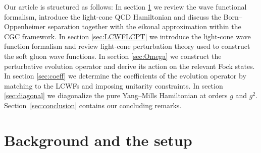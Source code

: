 \documentclass[a4paper,11pt]{article}
\begin{document}
Our article is structured as follows: In section \ref{sec:bgandsetup} we review the wave functional formalism, introduce the light-cone QCD Hamiltonian and discuss the Born–Oppenheimer separation together with the eikonal approximation within the CGC framework. In section \ref{sec:LCWFLCPT} we introduce the light-cone wave function formalism and review light-cone perturbation theory used to construct the soft gluon wave functions. In section \ref{sec:Omega} we construct the perturbative evolution operator and derive its action on the relevant Fock states. In section \ref{sec:coeff} we determine the coefficients of the evolution operator by matching to the LCWFs and imposing unitarity constraints. In section \ref{sec:diagonal} we diagonalize the {\color{chg}pure Yang--Mills} Hamiltonian at orders $g$ and $g^{2}$. {\color{chg}Section~\ref{sec:conclusion} contains our concluding remarks.}
\section{Background and the setup} \label{sec:bgandsetup}
\end{document}
